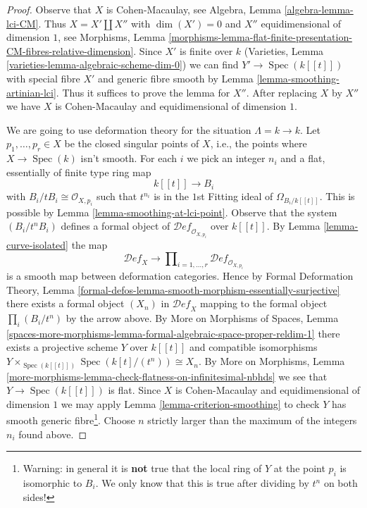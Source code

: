 \documentclass{stacks-project}
\theoremstyle{plain}
\theoremstyle{definition}
\theoremstyle{remark}
\numberwithin{equation}{subsection}
\def\Spec{\mathop{\mathrm{Spec}}}
\def\Deformationcategory{\mathcal{D}\!\mathit{ef}}
\begin{document}
\begin{proof}
Observe that $X$ is Cohen-Macaulay, see
Algebra, Lemma \ref{algebra-lemma-lci-CM}.
Thus $X = X' \amalg X''$ with $\dim(X') = 0$
and $X''$ equidimensional of dimension $1$, see Morphisms, Lemma
\ref{morphisms-lemma-flat-finite-presentation-CM-fibres-relative-dimension}.
Since $X'$ is finite over $k$ (Varieties, Lemma
\ref{varieties-lemma-algebraic-scheme-dim-0})
we can find $Y' \to \Spec(k[[t]])$ with special
fibre $X'$ and generic fibre smooth by
Lemma \ref{lemma-smoothing-artinian-lci}.
Thus it suffices to prove the lemma for $X''$.
After replacing $X$ by $X''$ we have $X$ is
Cohen-Macaulay and equidimensional of dimension $1$.

\medskip\noindent
We are going to use deformation theory for the situation $\Lambda = k \to k$.
Let $p_1, \ldots, p_r \in X$ be the closed singular points of $X$, i.e.,
the points where $X \to \Spec(k)$ isn't smooth. For each $i$ we pick
an integer $n_i$ and a flat, essentially of finite type ring map
$$
k[[t]] \longrightarrow B_i
$$
with $B_i/tB_i \cong \mathcal{O}_{X, p_i}$ such that
$t^{n_i}$ is in the $1$st Fitting ideal of $\Omega_{B_i/k[[t]]}$.
This is possible by Lemma \ref{lemma-smoothing-at-lci-point}.
Observe that the system $(B_i/t^nB_i)$ defines a formal object of
$\Deformationcategory_{\mathcal{O}_{X, p_i}}$ over $k[[t]]$.
By Lemma \ref{lemma-curve-isolated} the map
$$
\Deformationcategory_X
\longrightarrow
\prod\nolimits_{i = 1, \ldots, r} \Deformationcategory_{\mathcal{O}_{X, p_i}}
$$
is a smooth map between deformation categories. Hence by
Formal Deformation Theory, Lemma
\ref{formal-defos-lemma-smooth-morphism-essentially-surjective}
there exists a formal object $(X_n)$ in $\Deformationcategory_X$
mapping to the formal object $\prod_i (B_i/t^n)$ by the arrow above.
By More on Morphisms of Spaces, Lemma
\ref{spaces-more-morphisms-lemma-formal-algebraic-space-proper-reldim-1}
there exists a projective scheme $Y$ over $k[[t]]$ and compatible
isomorphisms $Y \times_{\Spec(k[[t]])} \Spec(k[t]/(t^n)) \cong X_n$.
By More on Morphisms, Lemma
\ref{more-morphisms-lemma-check-flatness-on-infinitesimal-nbhds}
we see that $Y \to \Spec(k[[t]])$ is flat.
Since $X$ is Cohen-Macaulay and equidimensional of dimension $1$
we may apply Lemma \ref{lemma-criterion-smoothing}
to check $Y$ has smooth generic fibre\footnote{Warning: in general it is
{\bf not} true that the local ring of $Y$ at the point
$p_i$ is isomorphic to $B_i$. We only know that this is true after
dividing by $t^n$ on both sides!}.
Choose $n$ strictly larger than the maximum of the integers $n_i$ found above.

\end{proof}
\end{document}
